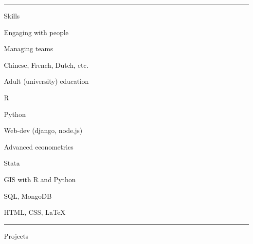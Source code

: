 \documentclass[letterpaper, english, 11pt]{article}
\newenvironment{packed_itemize}{
	\begin{itemize}
		\setlength{\itemsep}{1pt}
		\setlength{\parskip}{2pt}
		\setlength{\parsep}{2pt}
	} {\end{itemize}
}
\begin{document}
\hrule
 
Skills

\begin{footnotesize}
\begin{multicols}{3}
	\begin{packed_itemize}
		\item Engaging with people
		\item Managing teams
		\item Chinese, French, Dutch, etc.
		\item Adult (university) education
		\item R
		\item Python
		\item Web-dev (django, node.js)
		\item Advanced econometrics
		\item Stata
		\item GIS with R and Python
		\item SQL, MongoDB
		\item HTML, CSS, \LaTeX
	\end{packed_itemize}
\end{multicols}
\end{footnotesize}
\vspace{2pt}
\hrule

Projects
\end{document}
